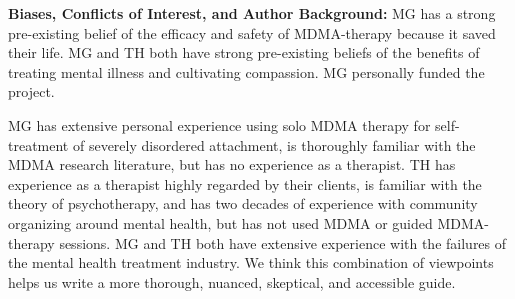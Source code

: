 \documentclass[12pt,letterpaper]{book}
\begin{document}
\textbf{Biases, Conflicts of Interest, and Author Background:} MG has a strong pre-existing belief of the efficacy and safety of MDMA-therapy because it saved their life. MG and TH both have strong pre-existing beliefs of the benefits of treating mental illness and cultivating compassion. MG personally funded the project.

MG has extensive personal experience using solo MDMA therapy for self-treatment of severely disordered attachment, is thoroughly familiar with the MDMA research literature, but has no experience as a therapist. TH has experience as a therapist highly regarded by their clients, is familiar with the theory of psychotherapy, and has two decades of experience with community organizing around mental health, but has not used MDMA or guided MDMA-therapy sessions. MG and TH both have extensive experience with the failures of the mental health treatment industry. We think this combination of viewpoints helps us write a more thorough, nuanced, skeptical, and accessible guide.
\end{document}
